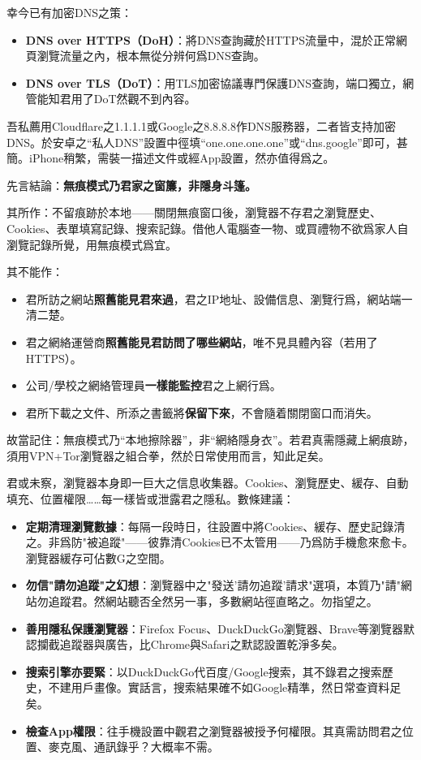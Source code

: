 幸今已有加密DNS之策：

\begin{itemize}
  \item \textbf{DNS over HTTPS（DoH）}：將DNS查詢藏於HTTPS流量中，混於正常網頁瀏覽流量之內，根本無從分辨何爲DNS查詢。
  \item \textbf{DNS over TLS（DoT）}：用TLS加密協議專門保護DNS查詢，端口獨立，網管能知君用了DoT然觀不到內容。
\end{itemize}

吾私薦用Cloudflare之1.1.1.1或Google之8.8.8.8作DNS服務器，二者皆支持加密DNS。於安卓之“私人DNS”設置中徑填“one.one.one.one”或“dns.google”即可，甚簡。iPhone稍繁，需裝一描述文件或經App設置，然亦值得爲之。


先言結論：\textbf{無痕模式乃君家之窗簾，非隱身斗篷。}

其所作：不留痕跡於本地——關閉無痕窗口後，瀏覽器不存君之瀏覽歷史、Cookies、表單填寫記錄、搜索記錄。借他人電腦查一物、或買禮物不欲爲家人自瀏覽記錄所覺，用無痕模式爲宜。

其不能作：

\begin{itemize}
  \item 君所訪之網站\textbf{照舊能見君來過}，君之IP地址、設備信息、瀏覽行爲，網站端一清二楚。
  \item 君之網絡運營商\textbf{照舊能見君訪問了哪些網站}，唯不見具體內容（若用了HTTPS）。
  \item 公司/學校之網絡管理員\textbf{一樣能監控}君之上網行爲。
  \item 君所下載之文件、所添之書籤將\textbf{保留下來}，不會隨着關閉窗口而消失。
\end{itemize}

故當記住：無痕模式乃“本地擦除器”，非“網絡隱身衣”。若君真需隱藏上網痕跡，須用VPN+Tor瀏覽器之組合拳，然於日常使用而言，知此足矣。


君或未察，瀏覽器本身即一巨大之信息收集器。Cookies、瀏覽歷史、緩存、自動填充、位置權限……每一樣皆或泄露君之隱私。數條建議：

\begin{itemize}
  \item \textbf{定期清理瀏覽數據}：每隔一段時日，往設置中將Cookies、緩存、歷史記錄清之。非爲防"被追蹤"——彼靠清Cookies已不太管用——乃爲防手機愈來愈卡。瀏覽器緩存可佔數G之空間。
  \item \textbf{勿信"請勿追蹤"之幻想}：瀏覽器中之"發送'請勿追蹤'請求"選項，本質乃"請"網站勿追蹤君。然網站聽否全然另一事，多數網站徑直略之。勿指望之。
  \item \textbf{善用隱私保護瀏覽器}：Firefox Focus、DuckDuckGo瀏覽器、Brave等瀏覽器默認攔截追蹤器與廣告，比Chrome與Safari之默認設置乾淨多矣。
  \item \textbf{搜索引擎亦要緊}：以DuckDuckGo代百度/Google搜索，其不錄君之搜索歷史，不建用戶畫像。實話言，搜索結果確不如Google精準，然日常查資料足矣。
  \item \textbf{檢查App權限}：往手機設置中觀君之瀏覽器被授予何權限。其真需訪問君之位置、麥克風、通訊錄乎？大概率不需。
\end{itemize}

